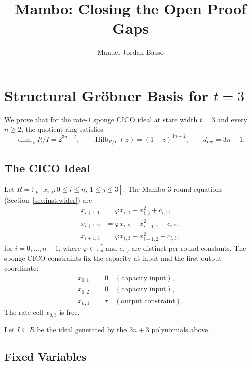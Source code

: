 \documentclass[a4paper,11pt]{article}
\newcommand{\Fp}{\mathbb{F}_p}
\begin{document}
\title{Mambo: Closing the Open Proof Gaps}
\author{Manuel Jordan Basso}
\date{}
\maketitle

\section{Structural Gr\"obner Basis for $t = 3$}\label{sec:t3}

We prove that for the rate-$1$ sponge CICO ideal at state width $t = 3$
and every $n \ge 2$, the quotient ring satisfies
\[
\dim_{\Fp} R/I = 2^{3n-2},\qquad
\operatorname{Hilb}_{R/I}(z) = (1+z)^{3n-2},\qquad
d_{\mathrm{reg}} = 3n-1.
\]

\subsection{The CICO Ideal}

Let $R = \Fp[x_{i,j} : 0 \le i \le n,\, 1 \le j \le 3]$. The Mambo-$3$
round equations (Section~\ref{sec:inst:wider}) are
\begin{align*}
x_{i+1,1} &= \varphi x_{i,1} + x_{i,3}^2 + c_{i,1},\\
x_{i+1,2} &= \varphi x_{i,2} + x_{i+1,1}^2 + c_{i,2},\\
x_{i+1,3} &= \varphi x_{i,3} + x_{i+1,2}^2 + c_{i,3},
\end{align*}
for $i = 0,\dots,n-1$, where $\varphi \in \Fp^\ast$ and
$c_{i,j}$ are distinct per-round constants. The sponge CICO constraints
fix the capacity at input and the first output coordinate:
\begin{align*}
x_{0,1} &= 0\quad (\text{capacity input}),\\
x_{0,2} &= 0\quad (\text{capacity input}),\\
x_{n,1} &= \tau\quad (\text{output constraint}).
\end{align*}
The rate cell $x_{0,3}$ is free.

Let $I \subseteq R$ be the ideal generated by the $3n+3$ polynomials above.

\subsection{Fixed Variables}
\end{document}
